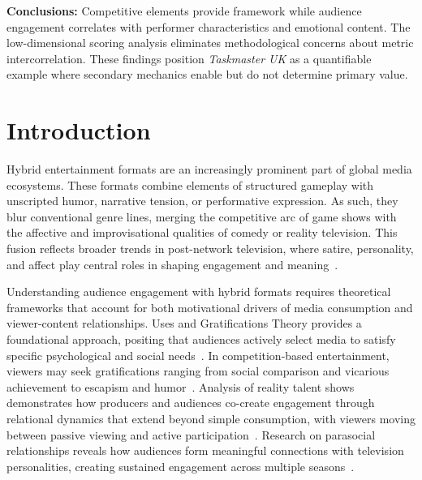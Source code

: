\documentclass[10pt,letterpaper]{article}
\begin{document}
\textbf{Conclusions:} Competitive elements provide framework while audience engagement correlates with performer characteristics and emotional content. The low-dimensional scoring analysis eliminates methodological concerns about metric intercorrelation. These findings position \textit{Taskmaster UK} as a quantifiable example where secondary mechanics enable but do not determine primary value.

\linenumbers

\section*{Introduction}

Hybrid entertainment formats are an increasingly prominent part of global media ecosystems. These formats combine elements of structured gameplay with unscripted humor, narrative tension, or performative expression. As such, they blur conventional genre lines, merging the competitive arc of game shows with the affective and improvisational qualities of comedy or reality television. This fusion reflects broader trends in post-network television, where satire, personality, and affect play central roles in shaping engagement and meaning~\cite{Gray2009}.

Understanding audience engagement with hybrid formats requires theoretical frameworks that account for both motivational drivers of media consumption and viewer-content relationships. Uses and Gratifications Theory provides a foundational approach, positing that audiences actively select media to satisfy specific psychological and social needs~\cite{Katz1973,Rubin2009}. In competition-based entertainment, viewers may seek gratifications ranging from social comparison and vicarious achievement to escapism and humor~\cite{Nabi2003}. Analysis of reality talent shows demonstrates how producers and audiences co-create engagement through relational dynamics that extend beyond simple consumption, with viewers moving between passive viewing and active participation~\cite{Hill2017}. Research on parasocial relationships reveals how audiences form meaningful connections with television personalities, creating sustained engagement across multiple seasons~\cite{Enli2012}.
\end{document}
